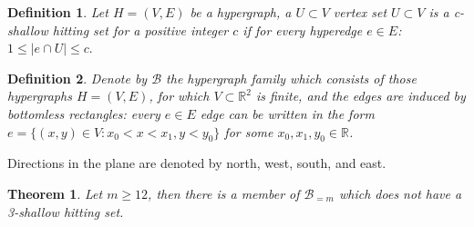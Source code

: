 \documentclass[10pt,a4paper]{amsart}
\newcommand{\R}{\mathbb{R}}
\newtheorem{theorem}{Theorem}
\newtheorem{definition}{Definition}
\begin{document}
\begin{definition}
 Let $H=(V,E)$ be a hypergraph, a $U\subset V$ vertex set $U\subset V$ is a {\it c-shallow hitting set} for a positive integer $c$ if for every hyperedge $e\in E$: $1\le|e\cap U|\le c.$
\end{definition} 

\begin{definition} Denote by $\mathcal{B}$ the hypergraph family which consists of those hypergraphs $H=(V,E)$, for which $V\subset \R^2$ is finite, and the edges are induced by bottomless rectangles: every $e\in E$ edge can be written in the form $e=\{(x,y)\in V: x_0 < x < x_1, y<y_0\}$ for some $x_0, x_1, y_0 \in\R$. 
\end{definition}

Directions in the plane are denoted by north, west, south, and east.

\begin{theorem}\label{bottomless}
Let $m \ge 12$, then there is a member of $\mathcal{B}_{=m}$ which does not have a 3-shallow hitting set.
\end{theorem}
\end{document}
